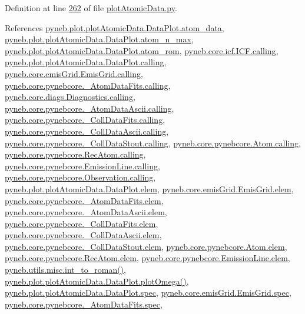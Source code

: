 Definition at line \hyperlink{plot_atomic_data_8py_source_l00262}{262} of file \hyperlink{plot_atomic_data_8py_source}{plot\-Atomic\-Data.\-py}.



References \hyperlink{plot_atomic_data_8py_source_l00071}{pyneb.\-plot.\-plot\-Atomic\-Data.\-Data\-Plot.\-atom\-\_\-data}, \hyperlink{plot_atomic_data_8py_source_l00106}{pyneb.\-plot.\-plot\-Atomic\-Data.\-Data\-Plot.\-atom\-\_\-n\-\_\-max}, \hyperlink{plot_atomic_data_8py_source_l00103}{pyneb.\-plot.\-plot\-Atomic\-Data.\-Data\-Plot.\-atom\-\_\-rom}, \hyperlink{icf_8py_source_l00016}{pyneb.\-core.\-icf.\-I\-C\-F.\-calling}, \hyperlink{plot_atomic_data_8py_source_l00042}{pyneb.\-plot.\-plot\-Atomic\-Data.\-Data\-Plot.\-calling}, \hyperlink{emis_grid_8py_source_l00044}{pyneb.\-core.\-emis\-Grid.\-Emis\-Grid.\-calling}, \hyperlink{pynebcore_8py_source_l00097}{pyneb.\-core.\-pynebcore.\-\_\-\-Atom\-Data\-Fits.\-calling}, \hyperlink{diags_8py_source_l00169}{pyneb.\-core.\-diags.\-Diagnostics.\-calling}, \hyperlink{pynebcore_8py_source_l00318}{pyneb.\-core.\-pynebcore.\-\_\-\-Atom\-Data\-Ascii.\-calling}, \hyperlink{pynebcore_8py_source_l00585}{pyneb.\-core.\-pynebcore.\-\_\-\-Coll\-Data\-Fits.\-calling}, \hyperlink{pynebcore_8py_source_l00936}{pyneb.\-core.\-pynebcore.\-\_\-\-Coll\-Data\-Ascii.\-calling}, \hyperlink{pynebcore_8py_source_l01156}{pyneb.\-core.\-pynebcore.\-\_\-\-Coll\-Data\-Stout.\-calling}, \hyperlink{pynebcore_8py_source_l01229}{pyneb.\-core.\-pynebcore.\-Atom.\-calling}, \hyperlink{pynebcore_8py_source_l02643}{pyneb.\-core.\-pynebcore.\-Rec\-Atom.\-calling}, \hyperlink{pynebcore_8py_source_l03385}{pyneb.\-core.\-pynebcore.\-Emission\-Line.\-calling}, \hyperlink{pynebcore_8py_source_l03541}{pyneb.\-core.\-pynebcore.\-Observation.\-calling}, \hyperlink{plot_atomic_data_8py_source_l00045}{pyneb.\-plot.\-plot\-Atomic\-Data.\-Data\-Plot.\-elem}, \hyperlink{emis_grid_8py_source_l00048}{pyneb.\-core.\-emis\-Grid.\-Emis\-Grid.\-elem}, \hyperlink{pynebcore_8py_source_l00090}{pyneb.\-core.\-pynebcore.\-\_\-\-Atom\-Data\-Fits.\-elem}, \hyperlink{pynebcore_8py_source_l00311}{pyneb.\-core.\-pynebcore.\-\_\-\-Atom\-Data\-Ascii.\-elem}, \hyperlink{pynebcore_8py_source_l00577}{pyneb.\-core.\-pynebcore.\-\_\-\-Coll\-Data\-Fits.\-elem}, \hyperlink{pynebcore_8py_source_l00927}{pyneb.\-core.\-pynebcore.\-\_\-\-Coll\-Data\-Ascii.\-elem}, \hyperlink{pynebcore_8py_source_l01163}{pyneb.\-core.\-pynebcore.\-\_\-\-Coll\-Data\-Stout.\-elem}, \hyperlink{pynebcore_8py_source_l01219}{pyneb.\-core.\-pynebcore.\-Atom.\-elem}, \hyperlink{pynebcore_8py_source_l02636}{pyneb.\-core.\-pynebcore.\-Rec\-Atom.\-elem}, \hyperlink{pynebcore_8py_source_l03389}{pyneb.\-core.\-pynebcore.\-Emission\-Line.\-elem}, \hyperlink{misc_8py_source_l00055}{pyneb.\-utils.\-misc.\-int\-\_\-to\-\_\-roman()}, \hyperlink{plot_atomic_data_8py_source_l00373}{pyneb.\-plot.\-plot\-Atomic\-Data.\-Data\-Plot.\-plot\-Omega()}, \hyperlink{plot_atomic_data_8py_source_l00046}{pyneb.\-plot.\-plot\-Atomic\-Data.\-Data\-Plot.\-spec}, \hyperlink{emis_grid_8py_source_l00049}{pyneb.\-core.\-emis\-Grid.\-Emis\-Grid.\-spec}, \hyperlink{pynebcore_8py_source_l00091}{pyneb.\-core.\-pynebcore.\-\_\-\-Atom\-Data\-Fits.\-spec}, 